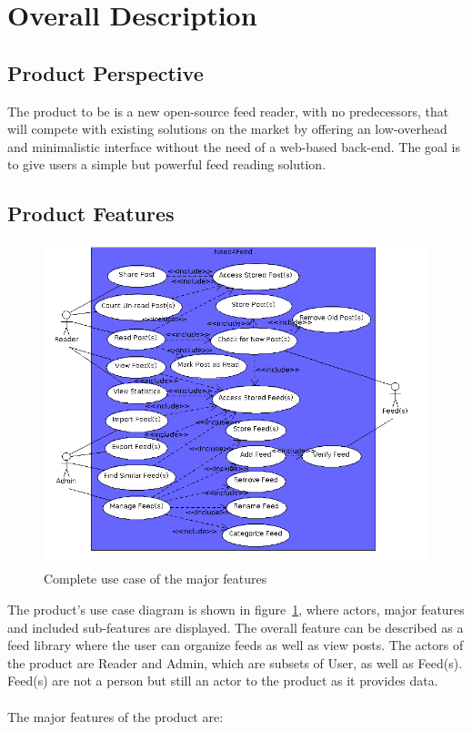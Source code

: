 \section{Overall Description}
\label{sec:overall_description}

\subsection{Product Perspective}
The product to be is a new open-source feed reader, with no predecessors, that will compete with existing solutions on the market by offering an low-overhead and minimalistic interface without the need of a web-based back-end. The goal is to give users a simple but powerful feed reading solution.

\subsection{Product Features}
\label{sec:product_features}
\begin{figure}[hbt]
\centering
\includegraphics[width=\textwidth]{./images/UseCaseDiagramGeneralFull.png}
\caption{Complete use case of the major features}
\label{fig:use_case}
\end{figure}
The product's use case diagram is shown in figure~\ref{fig:use_case}, where actors, major features and included sub-features are displayed. The overall feature can be described as a feed library where the user can organize feeds as well as view posts. The actors of the product are Reader and Admin, which are subsets of User, as well as Feed(s). Feed(s) are not a person but still an actor to the product as it provides data.\\ \\
The major features of the product are:

